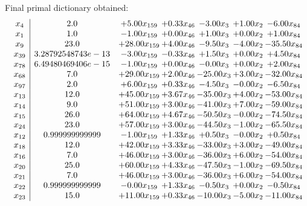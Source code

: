 \documentclass[8pt]{article}
\begin{document}
 Final primal dictionary obtained: 
\[\begin{array}{c| c c@{\hskip 2pt} c@{\hskip 2pt} c@{\hskip 2pt} c@{\hskip 2pt} c@{\hskip 2pt} }
 x_{4}   &  2.0 & +  5.00 x_{159} & +  0.33 x_{46} & -3.00 x_{3} & +  1.00 x_{2} & -6.00 x_{84}\\
 x_{1}   &  1.0 & -1.00 x_{159} & +  0.00 x_{46} & +  1.00 x_{3} & +  0.00 x_{2} & +  1.00 x_{84}\\
 x_{9}   &  23.0 & + 28.00 x_{159} & +  4.00 x_{46} & -9.50 x_{3} & -4.00 x_{2} & -35.50 x_{84}\\
 x_{39}   &  3.28792548743e-13 & -3.00 x_{159} & -0.33 x_{46} & +  1.50 x_{3} & +  0.00 x_{2} & +  4.50 x_{84}\\
 x_{78}   &  6.49480469406e-15 & -1.00 x_{159} & +  0.00 x_{46} & -0.00 x_{3} & +  0.00 x_{2} & +  2.00 x_{84}\\
 x_{68}   &  7.0 & + 29.00 x_{159} & +  2.00 x_{46} & -25.00 x_{3} & +  3.00 x_{2} & -32.00 x_{84}\\
 x_{97}   &  2.0 & +  6.00 x_{159} & +  0.33 x_{46} & -4.50 x_{3} & -0.00 x_{2} & -6.50 x_{84}\\
 x_{13}   &  12.0 & + 45.00 x_{159} & +  3.67 x_{46} & -35.00 x_{3} & +  4.00 x_{2} & -53.00 x_{84}\\
 x_{14}   &  9.0 & + 51.00 x_{159} & +  3.00 x_{46} & -41.00 x_{3} & +  7.00 x_{2} & -59.00 x_{84}\\
 x_{15}   &  26.0 & + 64.00 x_{159} & +  4.67 x_{46} & -50.50 x_{3} & -0.00 x_{2} & -74.50 x_{84}\\
 x_{24}   &  23.0 & + 57.00 x_{159} & +  3.00 x_{46} & -44.50 x_{3} & -1.00 x_{2} & -65.50 x_{84}\\
 x_{12}   &  0.999999999999 & -1.00 x_{159} & +  1.33 x_{46} & +  0.50 x_{3} & -0.00 x_{2} & +  0.50 x_{84}\\
 x_{18}   &  12.0 & + 42.00 x_{159} & +  3.33 x_{46} & -33.00 x_{3} & +  3.00 x_{2} & -49.00 x_{84}\\
 x_{16}   &  7.0 & + 46.00 x_{159} & +  3.00 x_{46} & -36.00 x_{3} & +  6.00 x_{2} & -54.00 x_{84}\\
 x_{20}   &  25.0 & + 60.00 x_{159} & +  4.33 x_{46} & -47.50 x_{3} & -1.00 x_{2} & -69.50 x_{84}\\
 x_{21}   &  7.0 & + 46.00 x_{159} & +  3.00 x_{46} & -36.00 x_{3} & +  6.00 x_{2} & -54.00 x_{84}\\
 x_{22}   &  0.999999999999 & -0.00 x_{159} & +  1.33 x_{46} & -0.50 x_{3} & +  0.00 x_{2} & -0.50 x_{84}\\
 x_{23}   &  15.0 & + 11.00 x_{159} & +  0.33 x_{46} & -10.00 x_{3} & -5.00 x_{2} & -11.00 x_{84}\\

\end{array}\]
\end{document}
